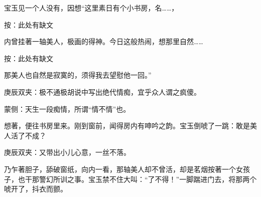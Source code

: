 \begin{parag}
    宝玉见一个人没有，因想“这里素日有个小书房，名……，\begin{subnote}按：此处有缺文\end{subnote}内曾挂著一轴美人，极画的得神。今日这般热闹，想那里自然……\begin{subnote}按：此处有缺文\end{subnote}那美人也自然是寂寞的，须得我去望慰他一回。”\begin{note}庚辰双夹：极不通极胡说中写出绝代情痴，宜乎众人谓之疯傻。\end{note}\begin{note}蒙侧：天生一段痴情，所谓“情不情”也。\end{note}想著，便往书房里来。刚到窗前，闻得房内有呻吟之韵。宝玉倒唬了一跳：敢是美人活了不成？\begin{note}庚辰双夹：又带出小儿心意，一丝不落。\end{note}乃乍著胆子，舔破窗纸，向内一看，那轴美人却不曾活，却是茗烟按著一个女孩子，也干那警幻所训之事。宝玉禁不住大叫：“了不得！”一脚踹进门去，将那两个唬开了，抖衣而颤。
\end{parag}


